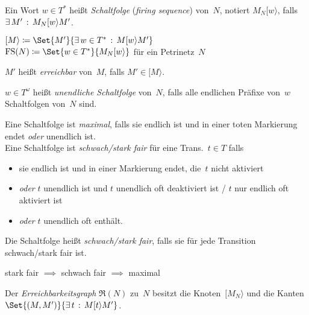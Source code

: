 \documentclass{cheat-sheet}
\newcommand{\activeTransition}[1]{[{#1}\rangle} %
\DeclareMathOperator{\FS}{FS} %
\newcommand{\ReachabilityGraph}{\mathfrak{R}} %
\begin{document}
\begin{defn}
  Ein Wort $w \in T^{*}$ heißt \emph{Schaltfolge} (\textit{firing sequence}) von~$N$, notiert $M_N \activeTransition{w}$, falls $\ex{M'} M_N \activeTransition{w} M'$.
\end{defn}

\begin{nota}
  \begin{minipage}[t]{0.8 \linewidth}
    $\activeTransition{M} \coloneqq \Set{M'}{\ex{w \in T^{*}} M \activeTransition{w} M'}$ \\
    $\FS(N) \coloneqq \Set{w \in T^{*}}{M_N \activeTransition{w}}$ \enspace
    für ein Petrinetz~$N$
  \end{minipage}
\end{nota}

\begin{defn}
  $M'$ heißt \emph{erreichbar} von~$M$, falls $M' \in \activeTransition{M}$.
\end{defn}

\begin{defn}
  $w \in T^\omega$ heißt \emph{unendliche Schaltfolge} von~$N$, falls alle endlichen Präfixe von~$w$ Schaltfolgen von~$N$ sind.
\end{defn}

\begin{defn}
  Eine Schaltfolge ist \emph{maximal}, falls sie endlich ist und in einer toten Markierung endet \textit{oder} unendlich ist. \\
  Eine Schaltfolge ist \emph{schwach/stark fair} für eine Trans.~$t \in T$ falls
  \begin{itemize}
    \item sie endlich ist und in einer Markierung endet, die~$t$ nicht aktiviert
    \item \textit{oder} $t$ unendlich ist und $t$ unendlich oft deaktiviert ist / $t$ nur endlich oft aktiviert ist
    \item \textit{oder} $t$ unendlich oft enthält.
  \end{itemize}
  Die Schaltfolge heißt \textit{schwach/stark fair}, falls sie für jede Transition schwach/stark fair ist.
\end{defn}

\begin{bem}
  stark fair $\implies$ schwach fair $\implies$ maximal
\end{bem}

\begin{defn}
  Der \emph{Erreichbarkeitsgraph} $\ReachabilityGraph(N)$ zu~$N$ besitzt die Knoten~$\activeTransition{M_N}$ und die Kanten $\Set{(M, M')}{\ex{t} M \activeTransition{t} M'}$.
\end{defn}
\end{document}
